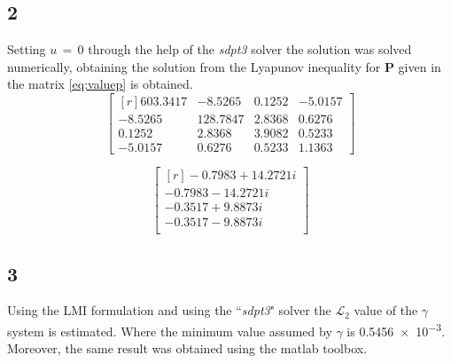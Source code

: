 \subsection{2}
Setting \(u\,=\,0\) through the help of the \emph{sdpt3} solver the solution
was solved numerically, obtaining the solution from the Lyapunov inequality for
 \(\mathbf{P}\) given in the matrix \eqref{eq:valuep} is obtained.
 \begin{equation}
 	\label{eq:valuep}
 	\begin{bmatrix*}[r]
 		603.3417	&   -8.5265	&    0.1252	&   -5.0157\\
		-8.5265	&  128.7847	&    2.8368	&    0.6276\\
		0.1252	&    2.8368	&    3.9082	&    0.5233\\
		-5.0157	&    0.6276	&    0.5233	&    1.1363
	\end{bmatrix*}
\end{equation}

\begin{equation}
	\label{eq:eigvalue}
	\begin{bmatrix*}[r]
		-0.7983 +14.2721i\\
  		-0.7983 -14.2721i\\
  		-0.3517 + 9.8873i\\
  		-0.3517 - 9.8873i\\
	\end{bmatrix*}
\end{equation}

\subsection{3}
Using the LMI formulation\cite{notelmi} and using the ``\emph{sdpt3}" solver the
 \(\mathcal{L}_{2}\) value of the \(\gamma\) system is estimated.
Where the minimum value assumed by \(\gamma\) is \num{0.5456e-3}.
Moreover, the same result was obtained using the matlab toolbox.

